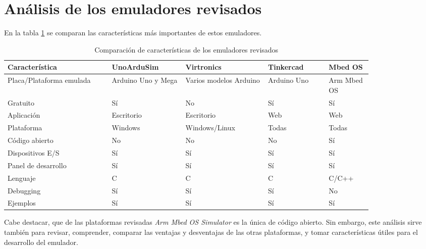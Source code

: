 \section{Análisis de los emuladores revisados}
\label{sec:Análisis de los emuladores revisados}

En la tabla \ref{tab:simuladores} se comparan las características más importantes de estos emuladores. 

\hfill \break
\hfill \break
\hfill \break
\hfill \break
\hfill \break
\hfill \break
\hfill \break
\hfill \break
\hfill \break

\begin{table}[ht]
\centering
\caption[Comparación de características de los emuladores revisados]{Comparación de características de los emuladores revisados}
\begin{tabular}{p{0.24\linewidth} p{0.17\linewidth}  p{0.19\linewidth}  p{0.14\linewidth}  p{0.10\linewidth}}
\toprule
\textbf{Característica} 
& \textbf{UnoArduSim}
& \textbf{Virtronics}
& \textbf{Tinkercad}
& \textbf{Mbed OS}
\\
\midrule
Placa/Plataforma emulada & Arduino Uno y Mega & Varios modelos Arduino & Arduino Uno & Arm Mbed OS\\
Gratuito &    Sí & No & Sí & Sí\\
Aplicación & Escritorio & Escritorio & Web & Web\\
Plataforma & Windows & Windows/Linux & Todas & Todas\\
Código abierto & No & No & No & Sí\\
Dispositivos E/S & Sí & Sí & Sí & Sí  \\
Panel de desarrollo & Sí & Sí & Sí & Sí \\
Lenguaje & C & C & C & C/C++\\
Debugging & Sí & Sí & Sí & No\\
Ejemplos & Sí & Sí & Sí & Sí\\
\bottomrule
\hline
\end{tabular}
\label{tab:simuladores}
\end{table}

Cabe destacar, que de las plataformas revisadas \textit{Arm Mbed OS Simulator} es la única de código abierto. Sin embargo, este análisis sirve también para revisar, comprender, comparar las ventajas y desventajas de las otras plataformas, y tomar características útiles para el desarrollo del emulador. 

